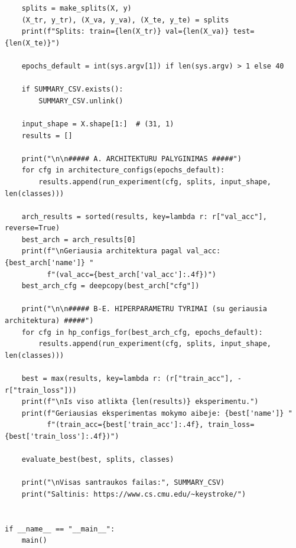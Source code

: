 \documentclass[]{VUMIFTemplateClass}
\begin{document}
\begin{verbatim}
    splits = make_splits(X, y)
    (X_tr, y_tr), (X_va, y_va), (X_te, y_te) = splits
    print(f"Splits: train={len(X_tr)} val={len(X_va)} test={len(X_te)}")

    epochs_default = int(sys.argv[1]) if len(sys.argv) > 1 else 40

    if SUMMARY_CSV.exists():
        SUMMARY_CSV.unlink()

    input_shape = X.shape[1:]  # (31, 1)
    results = []

    print("\n\n##### A. ARCHITEKTURU PALYGINIMAS #####")
    for cfg in architecture_configs(epochs_default):
        results.append(run_experiment(cfg, splits, input_shape, len(classes)))

    arch_results = sorted(results, key=lambda r: r["val_acc"], reverse=True)
    best_arch = arch_results[0]
    print(f"\nGeriausia architektura pagal val_acc: {best_arch['name']} "
          f"(val_acc={best_arch['val_acc']:.4f})")
    best_arch_cfg = deepcopy(best_arch["cfg"])

    print("\n\n##### B-E. HIPERPARAMETRU TYRIMAI (su geriausia architektura) #####")
    for cfg in hp_configs_for(best_arch_cfg, epochs_default):
        results.append(run_experiment(cfg, splits, input_shape, len(classes)))

    best = max(results, key=lambda r: (r["train_acc"], -r["train_loss"]))
    print(f"\nIs viso atlikta {len(results)} eksperimentu.")
    print(f"Geriausias eksperimentas mokymo aibeje: {best['name']} "
          f"(train_acc={best['train_acc']:.4f}, train_loss={best['train_loss']:.4f})")

    evaluate_best(best, splits, classes)

    print("\nVisas santraukos failas:", SUMMARY_CSV)
    print("Saltinis: https://www.cs.cmu.edu/~keystroke/")


if __name__ == "__main__":
    main()

\end{verbatim}
\end{document}
